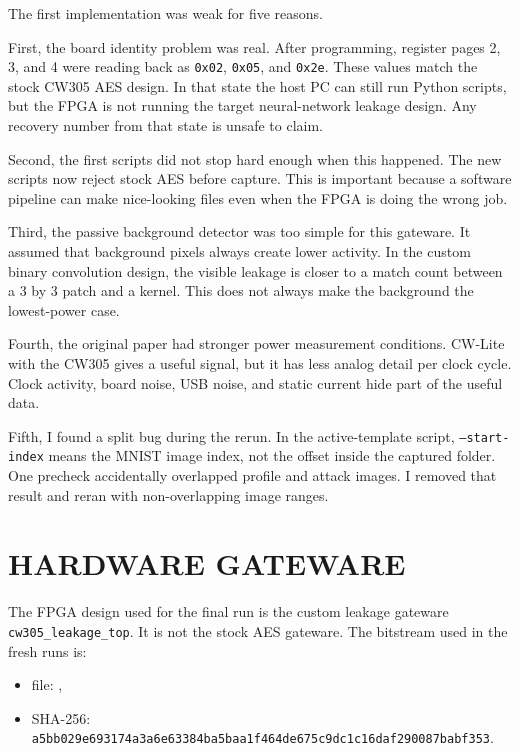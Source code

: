 \documentclass[11pt]{article}
\begin{document}
The first implementation was weak for five reasons.

First, the board identity problem was real. After programming, register pages
2, 3, and 4 were reading back as \texttt{0x02}, \texttt{0x05}, and
\texttt{0x2e}. These values match the stock CW305 AES design. In that state the
host PC can still run Python scripts, but the FPGA is not running the target
neural-network leakage design. Any recovery number from that state is unsafe to
claim.

Second, the first scripts did not stop hard enough when this happened. The new
scripts now reject stock AES before capture. This is important because a
software pipeline can make nice-looking files even when the FPGA is doing the
wrong job.

Third, the passive background detector was too simple for this gateware. It
assumed that background pixels always create lower activity. In the custom
binary convolution design, the visible leakage is closer to a match count
between a 3 by 3 patch and a kernel. This does not always make the background
the lowest-power case.

Fourth, the original paper had stronger power measurement conditions. CW-Lite
with the CW305 gives a useful signal, but it has less analog detail per clock
cycle. Clock activity, board noise, USB noise, and static current hide part of
the useful data.

Fifth, I found a split bug during the rerun. In the active-template script,
\texttt{--start-index} means the MNIST image index, not the offset inside the
captured folder. One precheck accidentally overlapped profile and attack
images. I removed that result and reran with non-overlapping image ranges.

\section{HARDWARE GATEWARE}

The FPGA design used for the final run is the custom leakage gateware
\texttt{cw305\_leakage\_top}. It is not the stock AES gateware. The bitstream
used in the fresh runs is:

\begin{itemize}
  \item file: ,
  \item SHA-256:
  \texttt{a5bb029e693174a3a6e63384ba5baa1f464de675c9dc1c16daf290087babf353}.
\end{itemize}
\end{document}
